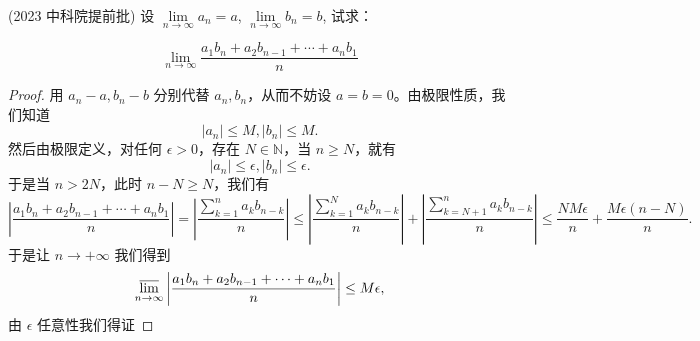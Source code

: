 \documentclass[lang=cn,10pt,thmcnt=section]{elegantbook}
\begin{document}
\begin{example}
	(2023 中科院提前批) 设 $\lim\limits_{n \to \infty} a_n = a$, $\lim\limits_{n \to \infty} b_n = b$, 试求：

\[
\lim_{n \to \infty} \frac{a_1 b_n + a_2 b_{n-1} + \cdots + a_n b_1}{n}
\]


\end{example}
\begin{proof}
	用 $a_n - a, b_n - b$ 分别代替 $a_n, b_n$，从而不妨设 $a = b = 0$。由极限性质，我们知道
\[
|a_n| \leq M, |b_n| \leq M. 
\]
然后由极限定义，对任何 $\epsilon > 0$，存在 $N \in \mathbb{N}$，当 $n \geq N$，就有
\[
|a_n| \leq \epsilon, |b_n| \leq \epsilon. 
\]
于是当 $n > 2N$，此时 $n - N \geq N$，我们有
\[
\left| \frac{a_1 b_n + a_2 b_{n-1} + \cdots + a_n b_1}{n} \right| = \left| \frac{\sum_{k=1}^n a_k b_{n-k}}{n} \right| \leq \left| \frac{\sum_{k=1}^N a_k b_{n-k}}{n} \right| + \left| \frac{\sum_{k=N+1}^n a_k b_{n-k}}{n} \right| \leq \frac{N M \epsilon}{n} + \frac{M \epsilon (n - N)}{n}.
\]
于是让 $n \to +\infty$ 我们得到
\[
\varlimsup_{n \to \infty} \left| \frac{a_1 b_n + a_2 b_{n-1} + \cdots + a_n b_1}{n} \right| \leq M \epsilon,
\]
由 $\epsilon$ 任意性我们得证
\end{proof}
\end{document}
